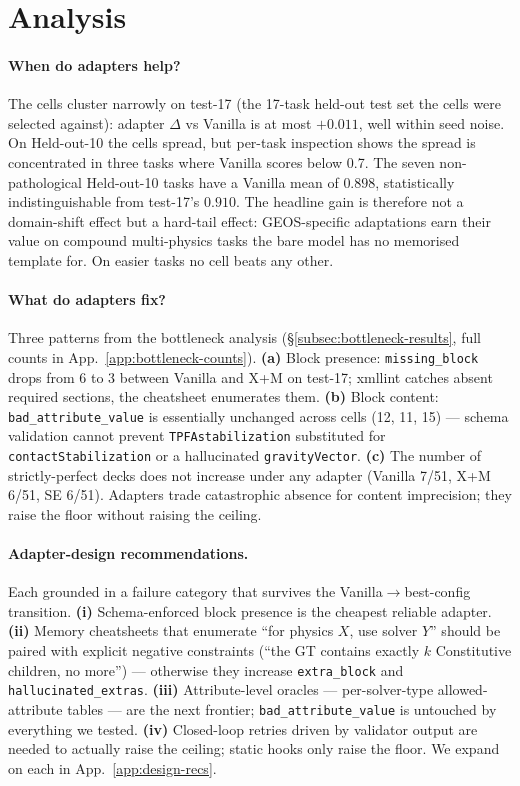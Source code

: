 \documentclass{article}
\begin{document}
\section{Analysis}
\label{sec:analysis}

\paragraph{When do adapters help?}
The cells cluster narrowly on test-17 (the 17-task held-out test set the cells were selected against): adapter $\Delta$ vs Vanilla is at most $+0.011$, well within seed noise. On Held-out-10 the cells spread, but per-task inspection shows the spread is concentrated in three tasks where Vanilla scores below 0.7. The seven non-pathological Held-out-10 tasks have a Vanilla mean of $0.898$, statistically indistinguishable from test-17's $0.910$. The headline gain is therefore not a domain-shift effect but a hard-tail effect: GEOS-specific adaptations earn their value on compound multi-physics tasks the bare model has no memorised template for. On easier tasks no cell beats any other.

\paragraph{What do adapters fix?}
Three patterns from the bottleneck analysis (\S\ref{subsec:bottleneck-results}, full counts in App.~\ref{app:bottleneck-counts}). \textbf{(a)} Block presence: \texttt{missing\_block} drops from 6 to 3 between Vanilla and X+M on test-17; xmllint catches absent required sections, the cheatsheet enumerates them. \textbf{(b)} Block content: \texttt{bad\_attribute\_value} is essentially unchanged across cells (12, 11, 15) --- schema validation cannot prevent \texttt{TPFAstabilization} substituted for \texttt{contactStabilization} or a hallucinated \texttt{gravityVector}. \textbf{(c)} The number of strictly-perfect decks does not increase under any adapter (Vanilla 7/51, X+M 6/51, SE 6/51). Adapters trade catastrophic absence for content imprecision; they raise the floor without raising the ceiling.

\paragraph{Adapter-design recommendations.}
Each grounded in a failure category that survives the Vanilla$\to$best-config transition. \textbf{(i)} Schema-enforced block presence is the cheapest reliable adapter. \textbf{(ii)} Memory cheatsheets that enumerate ``for physics $X$, use solver $Y$'' should be paired with explicit negative constraints (``the GT contains exactly $k$ Constitutive children, no more'') --- otherwise they increase \texttt{extra\_block} and \texttt{hallucinated\_extras}. \textbf{(iii)} Attribute-level oracles --- per-solver-type allowed-attribute tables --- are the next frontier; \texttt{bad\_attribute\_value} is untouched by everything we tested. \textbf{(iv)} Closed-loop retries driven by validator output are needed to actually raise the ceiling; static hooks only raise the floor. We expand on each in App.~\ref{app:design-recs}.
\end{document}

